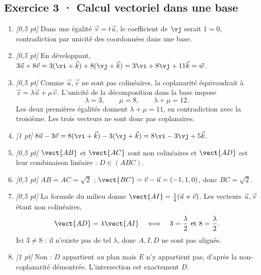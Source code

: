\subsection*{Exercice 3 · Calcul vectoriel dans une base}\begin{enumerate}

\item \textit{[0,5 pt]} Dans une égalité $\vec v=t\vec u$, le coefficient de $\vj $ serait $1=0$, contradiction par unicité des coordonnées dans une base.

\item \textit{[0,5 pt]} En développant, $3\vec u+8\vec v=3(\vi +\vec k)+8(\vj +\vec k)=3\vi +8\vj +11\vec k=\vec w$.

\item \textit{[0,5 pt]} Comme $\vec u,\vec v$ ne sont pas colinéaires, la coplanarité équivaudrait à $\vec z=\lambda\vec u+\mu\vec v$. L'unicité de la décomposition dans la base impose
\[\lambda=3,\qquad\mu=8,\qquad\lambda+\mu=12.\]
Les deux premières égalités donnent $\lambda+\mu=11$, en contradiction avec la troisième. Les trois vecteurs ne sont donc pas coplanaires.

\item \textit{[1 pt]} $8\vec u-3\vec v=8(\vi +\vec k)-3(\vj +\vec k)=8\vi -3\vj +5\vec k$.

\item \textit{[0,5 pt]} $\vect{AB}$ et $\vect{AC}$ sont non colinéaires et $\vect{AD}$ est leur combinaison linéaire : $D\in(ABC)$.

\item \textit{[0,5 pt]} $AB=AC=\sqrt2$ ; $\vect{BC}=\vec v-\vec u=(-1,1,0)$, donc $BC=\sqrt2$.

\item \textit{[0,5 pt]} La formule du milieu donne $\vect{AI}=\frac12(\vec u+\vec v)$. Les vecteurs $\vec u,\vec v$ étant non colinéaires,
\[\vect{AD}=\lambda\vect{AI}\quad\Longleftrightarrow\quad 3=\frac{\lambda}{2}\ \text{et}\ 8=\frac{\lambda}{2}.\]
Ici $3\ne 8$ : il n'existe pas de tel $\lambda$, donc $A,I,D$ ne sont pas alignés.

\item \textit{[1 pt]} Non : $D$ appartient au plan mais $E$ n'y appartient pas, d'après la non-coplanarité démontrée. L'intersection est exactement $D$.

\end{enumerate}


